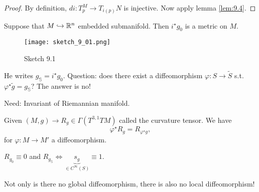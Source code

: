 \begin{proof}
    By definition, \(di:T_p^M\to T_{i(p)}N\) is injective. Now apply lemma \ref{lem:9.4}.
\end{proof}

\begin{example}
    Suppose that \(M\hookrightarrow \mathbb{R}^n\) embedded submanifold. Then \(i^\star g_0\) is a 
    metric on \(M\).
    \begin{figure}[H]\label{fig:9.1}
        \centering
        \texttt{[image: sketch\_9\_01.png]}
        \caption{Sketch 9.1}
    \end{figure}
    He writes \(g_{\mathbb{S}}=i^\star g_0\). 
    Question: does there exist a diffeomorphism \(\varphi:S\to \tilde{S}\) s.t. 
    \(\varphi^\star \tilde{g}=g_{\mathbb{S}}\)? The answer is no!

    Need: Invariant of Riemannian manifold.

\end{example}

Given \((M,g)\to R_g\in \Gamma(T^{3,1}TM)\) called the curvature tensor. We have 
\[\varphi^\star R_g=R_{\varphi^\star g},\]
for \(\varphi:M\to M'\) a diffeomorphism.

 \(R_{g_0}\equiv 0\) and \(R_{g_{\mathbb{S}}}\iff \underbrace{s_{g}}_{\in C^\infty(S)}\equiv 1\).

Not only is there no global diffeomorphism, there is also no local diffeomorphism!



